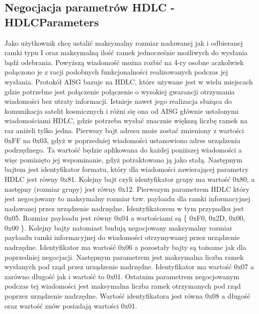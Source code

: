 		\subsection{Negocjacja parametrów HDLC - HDLCParameters}
			Jako użytkownik chcę ustalić maksymalny rozmiar nadawanej jak i odbieranej ramki typu I oraz maksymalną ilość ramek jednocześnie możliwych do wysłania bądź odebrania.
			\newline\newline
			Powyższą wiadomość można rozbić na 4-ry osobne aczkolwiek połączono je z racji podobnych funkcjonalności realizowanych podczas jej wysłania. Protokół AISG bazuje na HDLC, które używane jest w wielu miejscach
			gdzie potrzebne jest połączenie połączenie o wysokiej gwarancji otrzymania wiadomości bez utraty informacji. Istnieje nawet jego realizacja służąca do komunikacja satelit kosmicznych i różni się ona od AISG głównie
			ustalonymi wiadomościami HDLC, gdzie potrzeba wysłać znacznie większą liczbę ramek na raz aniżeli tylko jedna.
			Pierwszy bajt adresu może zostać zmieniony z wartości 0xFF na 0x03, gdyż w poprzedniej wiadomości ustanowiono adres urządzenia podrzędnego. Ta wartość będzie aplikowana do każdej poniższej wiadomości a więc pominięto jej wspominanie,
			gdyż potraktowano ją jako stałą.
			\newline
			Następnym bajtem jest identyfikator formatu, który dla wiadomości zawierającej parametry HDLC jest równy 0x81.
			\newline
			Kolejny bajt czyli identyfikator grupy ma wartość 0x80, a następny (rozmiar grupy) jest równy 0x12.
			\newline
			Pierwszym parametrem HDLC który jest negocjowany to maksymalny rozmiar tzw. payloadu dla ramki informacyjnej nadawanej przez urządzenie nadrzędne. Identyfikatorem w tym przypadku jest 0x05. Rozmiar payloadu jest równy 0x04 a wartościami są \{ 0xF0, 0x2D, 0x00, 0x00 \}.
			\newline
			Kolejny bajty natomiast budują negocjowany maksymalny rozmiar payloadu ramki informacyjnej do wiadomości otrzymywanej przez urządzenie nadrzędne. Identyfikator ma wartość 0x06 a pozostały bajty są tożsame jak dla poprzedniej
			negocjacji.
			\newline
			Następnym parametrem jest maksymalna liczba ramek wysłanych pod rząd przez urządzenie nadrzędne. Identyfikator ma wartość 0x07 a zarówno długość jak i wartość to 0x01.
			\newline
			Ostatnim parametrem negocjowanym podczas tej wiadomości jest maksymalna liczba ramek otrzymanych pod rząd poprzez urządzenie nadrzędne. Wartość identyfikatora jest równa 0x08 a długość oraz wartość znów posiadają wartości 0x01.
